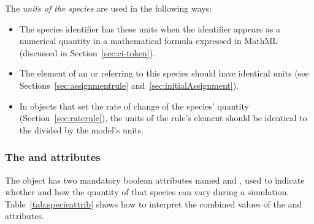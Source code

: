 The \emph{units of the species} are used in the following ways:
\begin{itemize}

\item The species identifier has these units when the
    identifier appears as a numerical quantity in a mathematical
  formula expressed in MathML (discussed in
  Section~\ref{sec:ci-token}).

\item The  element of an \AssignmentRule or
  \InitialAssignment referring to this species should have identical
  units (see Sections~\ref{sec:assignmentrule}
  and~\ref{sec:initialAssignment}).

\item In \RateRule objects that set the rate of change of the
  species' quantity (Section~\ref{sec:raterule}), the units of the
  rule's  element should be identical to the
   divided by the model's
   units.

\end{itemize}


\subsubsection{The  and  attributes}
\label{sec:species-constant}

The \Species object has two mandatory boolean attributes named
 and , used to indicate
whether and how the quantity of that species can vary during a
simulation.  Table~\ref{tab:specieattrib} shows how to interpret
the combined values of the  and
 attributes.

